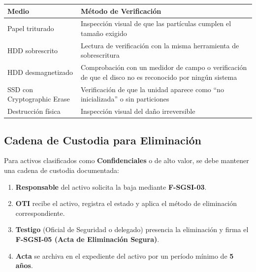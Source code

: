 \documentclass[10pt,letterpaper]{article}
\begin{document}
{\setlength{\RaggedRightRightskip}{0pt plus 5em}\small\sloppy \begin{longtable}[]{@{}
  >{\hspace{0pt}\RaggedRight\arraybackslash}p{}
  >{\hspace{0pt}\RaggedRight\arraybackslash}p{}@{}}
\toprule\noalign{}
\begin{minipage}[b]{\linewidth}\raggedright
Medio
\end{minipage} & \begin{minipage}[b]{\linewidth}\raggedright
Método de Verificación
\end{minipage} \\
\midrule\noalign{}
\endhead
\bottomrule\noalign{}
\endlastfoot
Papel triturado & Inspección visual de que las partículas cumplen el
tamaño exigido \\
HDD sobrescrito & Lectura de verificación con la misma herramienta de
sobrescritura \\
HDD desmagnetizado & Comprobación con un medidor de campo o verificación
de que el disco no es reconocido por ningún sistema \\
SSD con Cryptographic Erase & Verificación de que la unidad aparece como
``no inicializada'' o sin particiones \\
Destrucción física & Inspección visual del daño irreversible \\
\end{longtable}\normalsize}

\subsection{Cadena de Custodia para
Eliminación}\label{cadena-de-custodia-para-eliminaciuxf3n}

Para activos clasificados como \textbf{Confidenciales} o de alto valor,
se debe mantener una cadena de custodia documentada:

\begin{enumerate}
\def\labelenumi{\arabic{enumi}.}
\tightlist
\item
  \textbf{Responsable} del activo solicita la baja mediante
  \textbf{F-SGSI-03}.
\item
  \textbf{OTI} recibe el activo, registra el estado y aplica el método
  de eliminación correspondiente.
\item
  \textbf{Testigo} (Oficial de Seguridad o delegado) presencia la
  eliminación y firma el \textbf{F-SGSI-05 (Acta de Eliminación
  Segura)}.
\item
  \textbf{Acta} se archiva en el expediente del activo por un período
  mínimo de \textbf{5 años}.
\end{enumerate}
\end{document}
